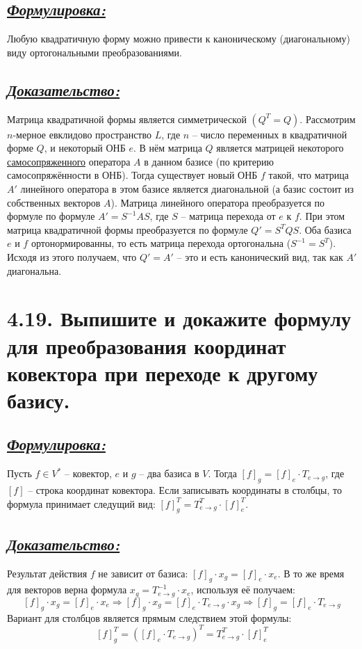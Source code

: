 \documentclass{article}
\begin{document}
\subsection*{\Large \underline{\textit{Формулировка: }}}
Любую квадратичную форму можно привести к каноническому (диагональному) виду ортогональными преобразованиями.

\subsection*{\Large \underline{\textit{Доказательство: }}}
Матрица квадратичной формы является симметрической $(Q^T = Q)$. Рассмотрим $n$-мерное евклидово пространство $L$, где $n$ -- число переменных в квадратичной форме $Q$, и некоторый ОНБ $e$. В нём матрица $Q$ является матрицей некоторого \underline{самосопряженного} оператора $A$ в данном базисе (по критерию самосопряжённости в ОНБ). Тогда существует новый ОНБ $f$ такой, что матрица $A'$ линейного оператора в этом базисе является диагональной (а базис состоит из собственных векторов $A$). Матрица линейного оператора преобразуется по формуле по формуле $A' = S^{-1} A S$, где $S$ -- матрица перехода от $e$ к $f$. При этом матрица квадратичной формы преобразуется по формуле $Q' = S^T Q S$. Оба базиса $e$ и $f$ ортонормированны, то есть матрица перехода ортогональна ($S^{-1} = S^T$). Исходя из этого получаем, что $Q' = A'$ -- это и есть канонический вид, так как $A'$ диагональна. 

\section*{\LARGE 4.19. Выпишите и докажите формулу для преобразования координат ковектора при переходе к другому базису. }
\subsection*{\Large \underline{\textit{Формулировка: }}}
Пусть $f \in V^*$ -- ковектор, $e$ и $g$ -- два базиса в $V$. Тогда $[f]_g = [f]_e \cdot T_{e \rightarrow g}$, где $[f]$ -- строка координат ковектора. Если записывать координаты в столбцы, то формула принимает следущий вид: $[f]_g^T = T_{e \rightarrow g}^T \cdot [f]_e^T$.

\subsection*{\Large \underline{\textit{Доказательство: }}}
Результат действия $f$ не зависит от базиса: $[f]_g \cdot x_g = [f]_e \cdot x_e$. В то же время для векторов верна формула $x_g = T_{e \rightarrow g}^{-1} \cdot x_e$, используя её получаем: $$[f]_g \cdot x_g = [f]_e \cdot x_e \Rightarrow [f]_g \cdot x_g = [f]_e \cdot T_{e \rightarrow g} \cdot x_g \Rightarrow [f]_g = [f]_e \cdot T_{e \rightarrow g}$$
Вариант для столбцов является прямым следствием этой формулы: 
$$
[f]_g^T = ([f]_e \cdot T_{e \rightarrow g})^T = T_{e \rightarrow g}^T \cdot [f]_e^T
$$
\end{document}
